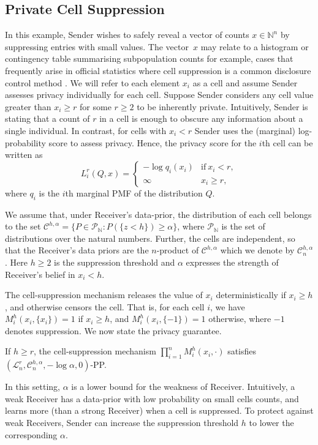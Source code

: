 \documentclass{article}
\theoremstyle{plain}
\theoremstyle{plain}
\theoremstyle{definition}
\theoremstyle{remark}
\theoremstyle{plain}
\begin{document}
\subsection{Private Cell Suppression} \label{sec:cell}
In this example, Sender wishes to safely reveal a vector of counts $x \in  \mathbb{N}^n$ by suppressing entries with small values. The vector~$x$ may relate to a histogram or contingency table summarising subpopulation counts for example, cases that frequently arise in official statistics where cell suppression is a common disclosure control method \citep{australianbureauofstatisticsTreatingAggregateData2021, cdcSuppressionRatesCounts2026}. We will refer to each element $x_i$ as a cell and assume Sender assesses privacy individually for each cell. Suppose Sender considers any cell value greater than $x_i \geq r$ for some $r \geq 2$ to be inherently private. Intuitively, Sender is stating that a count of $r$ in a cell is enough to obscure any information about a single individual. In contrast, for cells with $x_i < r$ Sender uses the (marginal) log-probability score to assess privacy. Hence, the privacy score for the $i$th cell can be written as
\begin{equation*}
    L_i^r(Q,x) =
    \begin{cases}
     -\log q_i(x_i) &\text{if}~ x_i < r, \\
     \infty & x_i \geq r,
    \end{cases}
\end{equation*} 
where $q_i$ is the $i$th marginal PMF of the distribution $Q$.

We assume that, under Receiver's data-prior, the distribution of each cell belongs to the set $\mathcal{C}^{h,\alpha} = \{P\in \mathcal{P}_\mathbb{N}: P(\{z < h\}) \geq \alpha\}$, where $\mathcal{P}_\mathbb{N}$ is the set of distributions over the natural numbers. Further, the cells are independent, so that the Receiver's data priors are the $n$-product of $\mathcal{C}^{h,\alpha}$ which we denote by $\mathcal{C}^{h,\alpha}_n$.
Here $h \ge 2$ is the suppression threshold and $\alpha$ expresses the strength of Receiver's belief in $x_i < h$. 

The cell-suppression mechanism releases the value of $x_i$ deterministically if $x_i \geq h$, and otherwise censors the cell. 
That is, for each cell $i$, we have~$M_i^h(x_i, \{x_i\}) = 1$ if $x_i \geq h$, and $M_i^h(x_i, \{-1\}) = 1$ otherwise, where $-1$ denotes suppression. We now state the privacy guarantee.
\begin{proposition}\label{prop:privcells}
    If $h\geq r$, the cell-suppression mechanism 
    $\prod_{i=1}^n M_i^h(x_i,\cdot)$ satisfies $(\mathcal{L}_n^r,\mathcal{C}^{h,\alpha}_{n},-\log \alpha,0)$-PP.
\end{proposition}
 In this setting, $\alpha$ is a lower bound for the weakness of Receiver. Intuitively, a weak Receiver has a data-prior with low probability on small cells counts, and learns more (than a strong Receiver) when a cell is suppressed. To protect against weak Receivers, Sender can increase the suppression threshold $h$ to lower the corresponding $\alpha$. 
\end{document}
